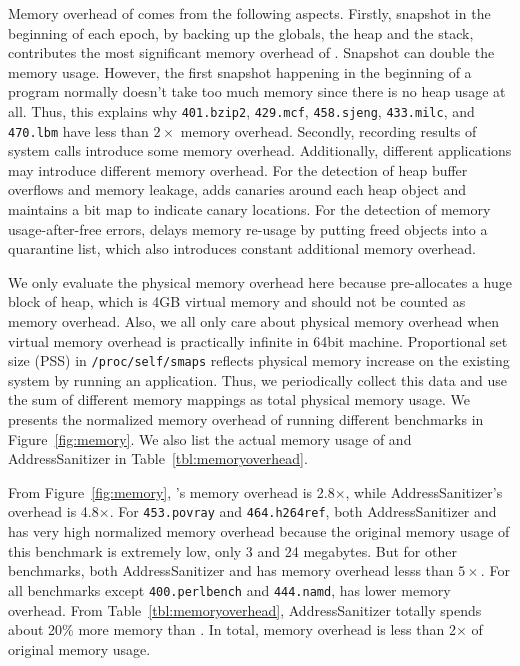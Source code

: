 Memory overhead of \doubletake{} comes from the following aspects. Firstly, snapshot in the beginning of each epoch, by backing up the globals, the heap and the stack, contributes the most significant memory overhead of \doubletake{}. Snapshot can double the memory usage. However, the first snapshot happening in the beginning of a program normally doesn't take too much memory since there is no heap usage at all. Thus, this explains why \texttt{401.bzip2}, \texttt{429.mcf}, \texttt{458.sjeng},  \texttt{433.milc}, and \texttt{470.lbm} have less than $2\times$ memory overhead. Secondly, recording results of system calls introduce some memory overhead. Additionally, different applications may introduce different memory overhead. For the detection of heap buffer overflows and memory leakage, \doubletake{} adds canaries around each heap object and maintains a bit map to indicate canary locations. For the detection of memory usage-after-free errors, \doubletake{} delays memory re-usage by putting freed objects into a quarantine list, which also introduces constant additional memory overhead. 

We only evaluate the physical memory overhead here because \doubletake{} pre-allocates a huge block of heap, which is 4GB virtual memory and should not be counted as memory overhead. Also, we all only care about physical memory overhead when virtual memory overhead is practically infinite in 64bit machine. Proportional set size (PSS) in \texttt{/proc/self/smaps} reflects physical memory increase on the existing system by running an application. Thus, we periodically collect this data and use the sum of different memory mappings as total physical memory usage. We presents the normalized memory overhead of running different benchmarks in Figure~\ref{fig:memory}. We also list the actual memory usage of \doubletake{} and AddressSanitizer in Table~\ref{tbl:memoryoverhead}.

From Figure~\ref{fig:memory}, \doubletake{}'s memory overhead is 2.8$\times$, while AddressSanitizer's overhead is 4.8$\times$. For \texttt{453.povray} and \texttt{464.h264ref}, both AddressSanitizer and \doubletake{} has very high normalized memory overhead because the original memory usage of this benchmark is extremely low, only 3 and 24 megabytes. But for other benchmarks, both AddressSanitizer and \doubletake{} has memory overhead lesss than $5\times$. For all benchmarks except \texttt{400.perlbench} and \texttt{444.namd}, \doubletake{} has lower memory overhead. 
From Table~\ref{tbl:memoryoverhead}, AddressSanitizer totally spends about 20\% more memory than \doubletake{}. In total, \doubletake{} memory overhead is less than 2$\times$ of original memory usage. 

